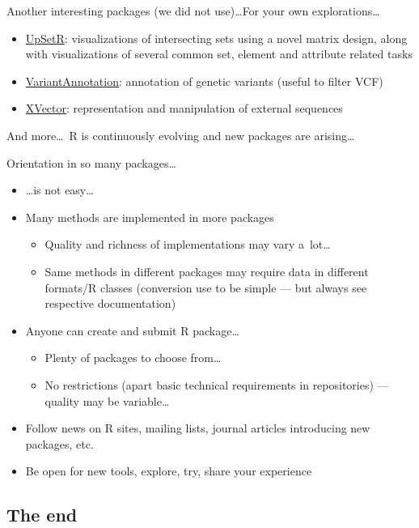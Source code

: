\documentclass[compress, ucs, xelatex, 11pt, xcolor=svgnames, aspectratio=169,
	hyperref={
		bookmarks=true,
		unicode=true,
		colorlinks=true,
		pdftitle={Molecular data in R},
		plainpages=false,
		pdfauthor={Vojtech Zeisek},
		pdfsubject={Course about phylogeny and evolution in R},
		pdfcreator={XeLaTeX},
		pdfkeywords={R, evolution, phylogeny, molecular data},
		linkcolor=Crimson, %
		anchorcolor=Magenta, %
		citecolor=Magenta, %
		filecolor=Magenta, %
		menucolor=Magenta, %
		urlcolor=DodgerBlue, %
		pdftex},
	url={hyphens, lowtilde} %
	]{beamer}
\begin{document}
\begin{frame}[allowframebreaks]{Another interesting packages (we did not use)\ldots}{For your own explorations\ldots}
\begin{itemize}
		\item \href{https://CRAN.R-project.org/package=UpSetR}{UpSetR}: visualizations of intersecting sets using a novel matrix design, along with visualizations of several common set, element and attribute related tasks
		\item \href{https://bioconductor.org/packages/VariantAnnotation/}{VariantAnnotation}: annotation of genetic variants (useful to filter VCF)
		\item \href{https://bioconductor.org/packages/release/bioc/html/XVector.html}{XVector}: representation and manipulation of external sequences
	\end{itemize}
	And more\ldots~R is continuously evolving and new packages are arising\ldots
\end{frame}

\begin{frame}{Orientation in so many packages\ldots}
	\begin{itemize}
		\item \ldots is not easy\ldots
		\item Many methods are implemented in more packages
		\begin{itemize}
			\item Quality and richness of implementations may vary a~lot\ldots
			\item Same methods in different packages may require data in different formats/R classes (conversion use to be simple --- but always see respective documentation)
		\end{itemize}
		\item Anyone can create and submit R package\ldots
		\begin{itemize}
			\item Plenty of packages to choose from\ldots
			\item No restrictions (apart basic technical requirements in repositories) --- quality may be variable\ldots
		\end{itemize}
		\item Follow news on R sites, mailing lists, journal articles introducing new packages, etc.
		\item Be open for new tools, explore, try, share your experience
	\end{itemize}
\end{frame}

\subsection{The end}
\end{document}
